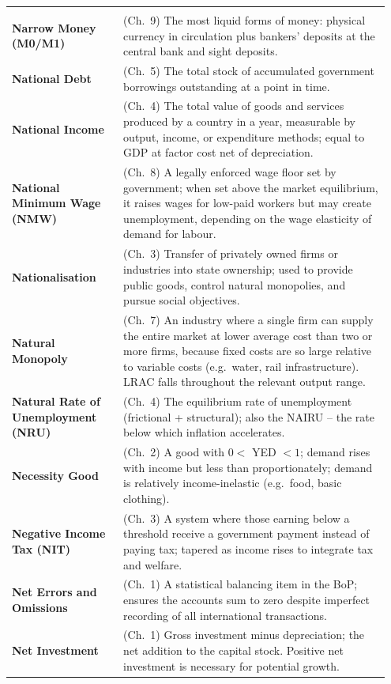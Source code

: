 \documentclass[11pt, a4paper, twoside]{book}
\begin{document}
\begin{longtable}{@{}>{\RaggedRight\arraybackslash}p{0.28\linewidth}>{\RaggedRight\arraybackslash}p{0.67\linewidth}@{}}
\multicolumn{2}{@{}l}{\textbf{\Large\color{CurveNavy} N}} \\[2pt]
\textbf{Narrow Money (M0/M1)} & (Ch.~9) The most liquid forms of money: physical currency in circulation plus bankers' deposits at the central bank and sight deposits. \\
\textbf{National Debt} & (Ch.~5) The total stock of accumulated government borrowings outstanding at a point in time. \\
\textbf{National Income} & (Ch.~4) The total value of goods and services produced by a country in a year, measurable by output, income, or expenditure methods; equal to GDP at factor cost net of depreciation. \\
\textbf{National Minimum Wage (NMW)} & (Ch.~8) A legally enforced wage floor set by government; when set above the market equilibrium, it raises wages for low-paid workers but may create unemployment, depending on the wage elasticity of demand for labour. \\
\textbf{Nationalisation} & (Ch.~3) Transfer of privately owned firms or industries into state ownership; used to provide public goods, control natural monopolies, and pursue social objectives. \\
\textbf{Natural Monopoly} & (Ch.~7) An industry where a single firm can supply the entire market at lower average cost than two or more firms, because fixed costs are so large relative to variable costs (e.g.\ water, rail infrastructure). LRAC falls throughout the relevant output range. \\
\textbf{Natural Rate of Unemployment (NRU)} & (Ch.~4) The equilibrium rate of unemployment (frictional + structural); also the NAIRU -- the rate below which inflation accelerates. \\
\textbf{Necessity Good} & (Ch.~2) A good with $0 < $ YED $< 1$; demand rises with income but less than proportionately; demand is relatively income-inelastic (e.g.\ food, basic clothing). \\
\textbf{Negative Income Tax (NIT)} & (Ch.~3) A system where those earning below a threshold receive a government payment instead of paying tax; tapered as income rises to integrate tax and welfare. \\
\textbf{Net Errors and Omissions} & (Ch.~1) A statistical balancing item in the BoP; ensures the accounts sum to zero despite imperfect recording of all international transactions. \\
\textbf{Net Investment} & (Ch.~1) Gross investment minus depreciation; the net addition to the capital stock. Positive net investment is necessary for potential growth. \\

\end{longtable}
\end{document}
